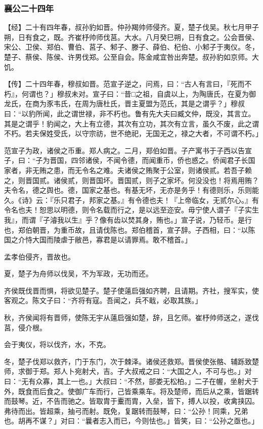 \documentclass[]{article}
\begin{document}
\hypertarget{header-n2160}{%
\subsubsection{襄公二十四年}\label{header-n2160}}

【经】二十有四年春，叔孙豹如晋。仲孙羯帅师侵齐。夏，楚子伐吴。秋七月甲子朔，日有食之，既。齐崔杼帅师伐莒。大水。八月癸巳朔，日有食之。公会晋侯、宋公、卫侯、郑伯、曹伯、莒子、邾子、滕子、薛伯、杞伯、小邾子于夷仪。冬，楚子、蔡侯、陈侯、许男伐郑。公至自会。陈金咸宜咎出奔楚。叔孙豹如京师。大饥。

【传】二十四年春，穆叔如晋。范宣子逆之，问焉，曰：``古人有言曰，『死而不朽』，何谓也？」穆叔未对。宣子曰：``昔□之祖，自虞以上，为陶唐氏，在夏为御龙氏，在商为豕韦氏，在周为唐杜氏，晋主夏盟为范氏，其是之谓乎？」穆叔曰：``以豹所闻，此之谓世禄，非不朽也。鲁有先大夫曰臧文仲，既没，其言立。其是之谓乎！豹闻之，大上有立德，其次有立功，其次有立言，虽久不废，此之谓不朽。若夫保姓受氏，以守宗祊，世不绝祀，无国无之，禄之大者，不可谓不朽。」

范宣子为政，诸侯之币重。郑人病之。二月，郑伯如晋。子产寓书于子西以告宣子，曰：``子为晋国，四邻诸侯，不闻令德，而闻重币，侨也惑之。侨闻君子长国家者，非无贿之患，而无令名之难。夫诸侯之贿聚于公室，则诸侯贰。若吾子赖之，则晋国贰。诸侯贰，则晋国坏。晋国贰，则子之家坏。何没没也！将焉用贿？夫令名，德之舆也。德，国家之基也。有基无坏，无亦是务乎！有德则乐，乐则能久。《诗》云：『乐只君子，邦家之基。』有令德也夫！『上帝临女，无贰尔心。』有令名也夫！恕思以明德，则令名载而行之，是以远至迩安。毋宁使人谓子『子实生我』，而谓『子濬我以生』乎？像有齿以焚其身，贿也。」宣子说，乃轻币。是行也，郑伯朝晋，为重币故，且请伐陈也。郑伯稽首，宣子辞。子西相，曰：``以陈国之介恃大国而陵虐于敝邑，寡君是以请罪焉。敢不稽首。」

孟孝伯侵齐，晋故也。

夏，楚子为舟师以伐吴，不为军政，无功而还。

齐侯既伐晋而惧，将欲见楚子。楚子使薳启强如齐聘，且请期。齐社，搜军实，使客观之。陈文子曰：``齐将有寇。吾闻之，兵不戢，必取其族。」

秋，齐侯闻将有晋师，使陈无宇从薳启强如楚，辞，且乞师。崔杼帅师送之，遂伐莒，侵介根。

会于夷仪，将以伐齐，水，不克。

冬，楚子伐郑以救齐，门于东门，次于棘泽。诸侯还救郑。晋侯使张骼、辅跞致楚师，求御于郑。郑人卜宛射犬，吉。子大叔戒之曰：``大国之人，不可与也。」对曰：``无有众寡，其上一也。」大叔曰：``不然，部娄无松柏。」二子在幄，坐射犬于外，既食而后食之。使御广车而行，己皆乘乘车。将及楚师，而后从之乘，皆踞转而鼓琴。近，不告而驰之。皆取胄于櫜而胄，入垒，皆下，搏人以投，收禽挟囚。弗待而出。皆超乘，抽弓而射。既免，复踞转而鼓琴，曰：``公孙！同乘，兄弟也。胡再不谋？」对曰：``曩者志入而已，今则怯也。」皆笑，曰：``公孙之亟也。」
\end{document}
